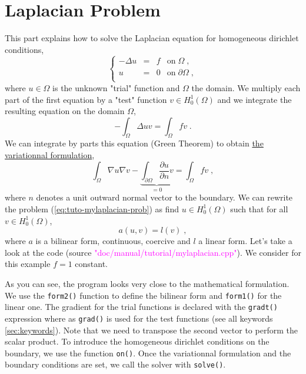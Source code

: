 %


\section{Laplacian Problem}
\label{sec:tuto-mylaplacian}

This part explains how to solve the Laplacian equation 
for homogeneous dirichlet conditions,
%
\begin{equation}
\left\{
\begin{array}{rcll}
    -\Delta u & = & f & \text{on}\;\Omega \;, \\
            u & = & 0 & \text{on}\;\partial\Omega \;,\\
\end{array}
\right.
\label{eq:tuto-mylaplacian-prob}
\end{equation}
%
where $u\in\Omega$ is the unknown "trial" function and $\Omega$ the domain.
%
We multiply each part of the first equation by a "test" function $v\in H_0^1(\Omega)$ 
and we integrate the resulting equation on the domain $\Omega$,
%
\begin{equation}
-\int_\Omega \Delta u v = \int_\Omega f v \;.
\end{equation}
%
We can integrate by parts this equation (Green Theorem) to obtain \underline{the variationnal
formulation},
%
\begin{equation}
\int_\Omega \nabla u \nabla v
-\underbrace{ \int_{\partial\Omega} \frac{\partial u}{\partial n} v }_{= 0}
=\int_\Omega f v \;,
\end{equation}
%
where $n$ denotes a unit outward normal vector to the boundary. We can rewrite the problem
(\ref{eq:tuto-mylaplacian-prob}) as find $u\in H_0^1(\Omega)$ such that for all
$v\in H_0^1(\Omega)$,
%
\begin{equation}
a(u,v)=l(v) \;,
\end{equation}
where $a$ is a bilinear form, continuous, coercive and $l$ a linear form.
Let's take a look at the \feel code
(source \textcolor{magenta}{"doc/manual/tutorial/mylaplacian.cpp"}).
We consider for this example $f=1$ constant.
%
\vspace{2mm}

\vspace{2mm}
%
As you can see, the program looks very close to the mathematical formulation.
We use the \lstinline!form2()! function to define the bilinear form and \lstinline!form1()!
for the linear one. The gradient for the trial functions is declared with the \lstinline!gradt()!
expression where as \lstinline!grad()! is used for the test functions
(see all keywords \ref{sec:keywords}).
Note that we need to transpose the second vector to perform the scalar product.
To introduce the homogeneous dirichlet conditions on the boundary, we use the function
\lstinline!on()!. Once the variationnal formulation and the boundary conditions are set, we call
the solver with \lstinline!solve()!.






